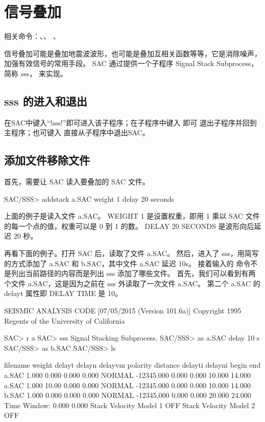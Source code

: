 \section{信号叠加}
\label{sec:stack-files}
相关命令：、、
、

信号叠加可能是叠加地震波波形，也可能是叠加互相关函数等等，它是消除噪声，加强有效信号的常用手段。
SAC 通过提供一个子程序 Signal Stack Subprocess，简称 sss， 来实现。

\subsection{sss 的进入和退出}
在SAC中键入``!sss!''即可进入该子程序；在子程序中键入  即可
退出子程序并回到主程序；也可键入  直接从子程序中退出SAC。

\subsection{添加文件移除文件}

首先，需要让 SAC 读入要叠加的 SAC 文件。

\begin{SACCode}
SAC/SSS> addstack a.SAC weight 1 delay 20 seconds
\end{SACCode}

上面的例子是读入文件 a.SAC。
WEIGHT 1 是设置权重，即用 1 乘以 SAC 文件的每一个点的值，权重可以是 0 到 1 的数。
DELAY 20 SECONDS 是波形向后延迟 20 秒。

再看下面的例子。打开 SAC 后，读取了文件 a.SAC。
然后，进入了 sss，用简写的方式添加了 a.SAC 和 b.SAC，其中文件 a.SAC 延迟 10s。
接着输入的  命令不是列出当前路径的内容而是列出 sss 添加了哪些文件。
首先，我们可以看到有两个文件 a.SAC，这是因为之前在 sss 外读取了一次文件 a.SAC。
第二个 a.SAC 的 delayt 属性即 DELAY TIME 是 10。

\begin{SACCode}
SEISMIC ANALYSIS CODE [07/05/2015 (Version 101.6a)]
Copyright 1995 Regents of the University of California

SAC> r a
SAC> sss
Signal Stacking Subprocess.
SAC/SSS> as a.SAC delay 10 s
SAC/SSS> as b.SAC
SAC/SSS> ls

 filename  weight      delayt      delayn     delayvm   polarity   distance
                           delayti     delayni      begin       end
 a.SAC         1.000       0.000       0.000       0.000   NORMAL   -12345.000
                             0.000       0.000      10.000      14.000
 a.SAC         1.000       10.00       0.000       0.000   NORMAL   -12345.000
                             0.000       0.000      10.000      14.000
 b.SAC         1.000       0.000       0.000       0.000   NORMAL   -12345.000
                             0.000       0.000      20.000      24.000
 Time Window:       0.000       0.000
 Stack Velocity Model 1 OFF
 Stack Velocity Model 2 OFF
\end{SACCode}

